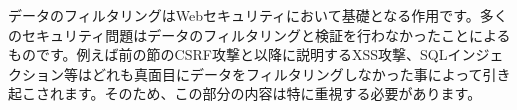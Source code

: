データのフィルタリングはWebセキュリティにおいて基礎となる作用です。多くのセキュリティ問題はデータのフィルタリングと検証を行わなかったことによるものです。例えば前の節のCSRF攻撃と以降に説明するXSS攻撃、SQLインジェクション等はどれも真面目にデータをフィルタリングしなかった事によって引き起こされます。そのため、この部分の内容は特に重視する必要があります。
